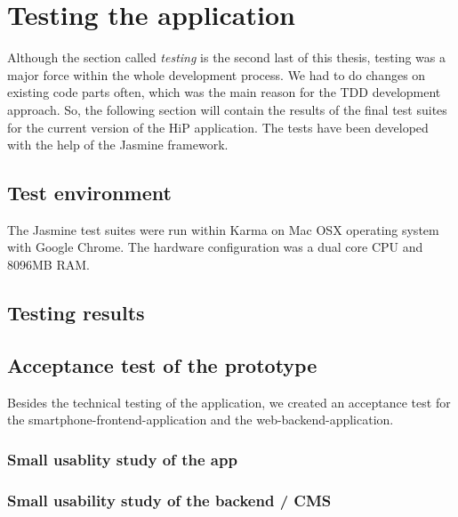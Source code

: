 \chapter[Testing the application]{Testing the application}
Although the section called \textit{testing} is the second last of this thesis, testing was a major force within the whole development process. We had to do changes on existing code parts often, which was the main reason for the \ac{TDD} development approach. So, the following section will contain the results of the final test suites for the current version of the HiP application. The tests have been developed with the help of the Jasmine framework.%
  
\section{Test environment}
The Jasmine test suites were run within Karma on Mac OSX operating system with Google Chrome. The hardware configuration was a dual core \ac{CPU} and 8096MB \ac{RAM}.

\section{Testing results}

\section{Acceptance test of the prototype}
Besides the technical testing of the application, we created an acceptance test for the smartphone-frontend-application and the web-backend-application.

\subsection{Small usablity study of the app}

\subsection{Small usability study of the backend / CMS}
